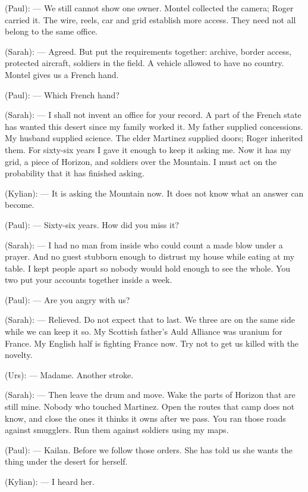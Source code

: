 \begin{room}
(Paul): --- We still cannot show one owner. Montel collected the camera; Roger carried it. The wire, reels, car and grid establish more access. They need not all belong to the same office.

(Sarah): --- Agreed. But put the requirements together: archive, border access, protected aircraft, soldiers in the field. A vehicle allowed to have no country. Montel gives us a French hand.

(Paul): --- Which French hand?

(Sarah): --- I shall not invent an office for your record. A part of the French state has wanted this desert since my family worked it. My father supplied concessions. My husband supplied science. The elder Martinez supplied doors; Roger inherited them. For sixty-six years I gave it enough to keep it asking me. Now it has my grid, a piece of Horizon, and soldiers over the Mountain. I must act on the probability that it has finished asking.

(Kylian): --- It is asking the Mountain now. It does not know what an answer can become.

(Paul): --- Sixty-six years. How did you miss it?

(Sarah): --- I had no man from inside who could count a made blow under a prayer. And no guest stubborn enough to distrust my house while eating at my table. I kept people apart so nobody would hold enough to see the whole. You two put your accounts together inside a week.

(Paul): --- Are you angry with us?

(Sarah): --- Relieved. Do not expect that to last. We three are on the same side while we can keep it so. My Scottish father's Auld Alliance was uranium for France. My English half is fighting France now. Try not to get us killed with the novelty.

(Urs): --- Madame. Another stroke.

(Sarah): --- Then leave the drum and move. Wake the parts of Horizon that are still mine. Nobody who touched Martinez. Open the routes that camp does not know, and close the ones it thinks it owns after we pass. You ran those roads against smugglers. Run them against soldiers using my maps.

\centerline{}

(Paul): --- Kailan. Before we follow those orders. She has told us she wants the thing under the desert for herself.

(Kylian): --- I heard her.


\end{room}
